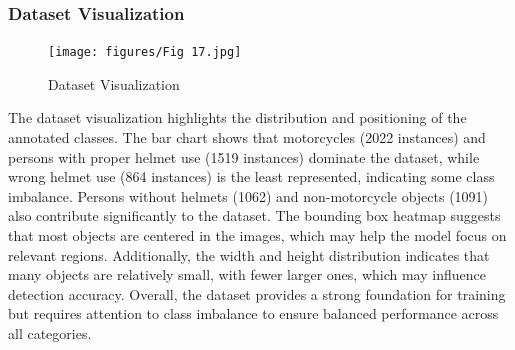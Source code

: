 \begin{refsection}
\begin{refsection}
\subsubsection{Dataset Visualization}
\begin{figure}[ht]
    \centering
	\texttt{[image: figures/Fig 17.jpg]}
	\caption[Dataset Visualization]{Dataset Visualization}
	\label{fig:dataset_visualization}
\end{figure}

\noindent
The dataset visualization highlights the distribution and positioning of the annotated classes. The bar chart shows that motorcycles (2022 instances) and persons with proper helmet use (1519 instances) dominate the dataset, while wrong helmet use (864 instances) is the least represented, indicating some class imbalance. Persons without helmets (1062) and non-motorcycle objects (1091) also contribute significantly to the dataset. The bounding box heatmap suggests that most objects are centered in the images, which may help the model focus on relevant regions. Additionally, the width and height distribution indicates that many objects are relatively small, with fewer larger ones, which may influence detection accuracy. Overall, the dataset provides a strong foundation for training but requires attention to class imbalance to ensure balanced performance across all categories.


\end{refsection}
\end{refsection}
